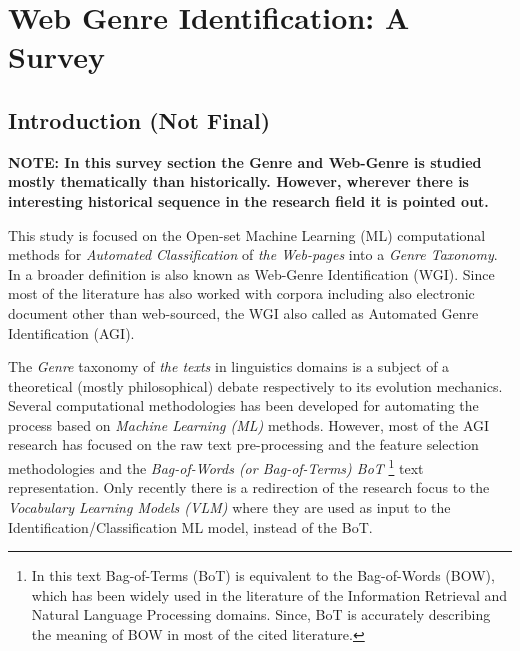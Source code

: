 
\chapter{Web Genre Identification: A Survey}

\label{chap:relevant_work}


\newcommand{\keyword}[1]{\textbf{#1}}
\newcommand{\tabhead}[1]{\textbf{#1}}
\newcommand{\code}[1]{\texttt{#1}}
\newcommand{\file}[1]{\texttt{\bfseries#1}}
\newcommand{\option}[1]{\texttt{\itshape#1}}


\section{Introduction (Not Final)}\label{chap:relevant_work:sec:intro}

\textbf{NOTE: In this survey section the Genre and Web-Genre is studied mostly thematically than historically. However, wherever there is interesting historical sequence in the research field it is pointed out.}

This study is focused on the Open-set Machine Learning (ML) computational methods for \textit{Automated Classification} of \textit{the Web-pages} into a \textit{Genre Taxonomy}. In a broader definition is also known as Web-Genre Identification (WGI). Since most of the literature has also worked with corpora including also electronic document other than web-sourced, the WGI also called as Automated Genre Identification (AGI).

The \textit{Genre} taxonomy of \textit{the texts} in linguistics domains is a subject of a theoretical (mostly philosophical) debate respectively to its evolution mechanics. Several computational methodologies has been developed for automating the process based on \textit{Machine Learning (ML)} methods. However, most of the AGI research has focused on the raw text pre-processing and the feature selection methodologies and the \textit{Bag-of-Words (or Bag-of-Terms) BoT }\footnote{In this text Bag-of-Terms (BoT) is equivalent to the Bag-of-Words  (BOW), which has been widely used in the literature of the Information Retrieval and Natural Language Processing domains. Since, BoT is accurately describing the meaning of BOW in most of the cited literature.} text representation. Only recently there is a redirection of the research focus to the \textit{Vocabulary Learning Models (VLM)} where they are used as input to the Identification/Classification ML model, instead of the BoT. 






